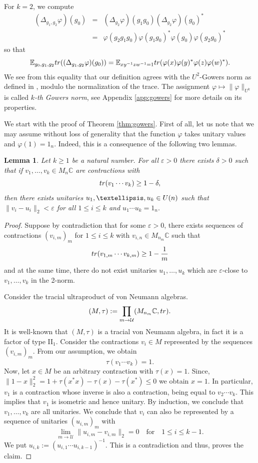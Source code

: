 \documentclass[a4paper,11pt]{amsproc}
\theoremstyle{plain}
\newtheorem{lemma}[theorem]{Lemma}
\theoremstyle{definition}
\begin{document}
For $k=2$, we compute
\begin{eqnarray*}
(\Delta_{g_1,g_2} \varphi)(g_0) &=& 
(\Delta_{g_2} \varphi)(g_1g_0) (\Delta_{g_2} \varphi)(g_0)^{*} \\
&=& \varphi(g_2g_1g_0) \varphi(g_1g_0)^{*} \varphi(g_0) \varphi(g_2g_0)^{*}
\end{eqnarray*}
so that
$${\mathbb E}_{g_0,g_1,g_{2}} {\rm tr}((\Delta_{g_1,g_2} \varphi)(g_0)) =  {\mathbb E}_{xy^{-1}zw^{-1}=1} {\rm tr}(\varphi(x)\varphi(y)^{*}\varphi(z)\varphi(w)^{*}).$$
We see from this equality that our definition agrees with the $U^2$-Gowers norm as defined in \cite{MR3733361}, modulo the normalization of the trace. The assignment $\varphi \mapsto \|\varphi\|_{U^k}$ is called \emph{$k$-th Gowers norm}, see Appendix \ref{app:gowers} for more details on its properties.

We start with the proof of Theorem \ref{thm:gowers}. First of all, let us note that we may assume without loss of generality that the function $\varphi$ takes unitary values and $\varphi(1)=1_n.$ Indeed, this is a consequence of the following two lemmas.

\begin{lemma} \label{lem:unitary}
Let $k \geq 1$ be a natural number. For all $\varepsilon>0$ there exists $\delta>0$ such that if
$v_1,\dots,v_k \in M_n \mathbb C$ are contractions with 
$${\rm tr}(v_1 \cdots v_k) \geq 1-\delta,$$
then there exists unitaries $u_1,\dots,u_k \in {\rm U}(n)$ such that $\|v_i - u_i\|_2 < \varepsilon$ for all $1 \leq i \leq k$ and
$u_1 \cdots u_k=1_n.$
\end{lemma}
\begin{proof}
Suppose by contradiction that for some $\varepsilon>0$, there exists sequences of contractions
$(v_{i,m})_m$ for $1 \leq i \leq k$ with $v_{i,n} \in M_{n_m} \mathbb C$ such that
$${\rm tr}(v_{1,m} \cdots v_{k,m}) \geq 1 - \frac1m$$ and at the same time, there do not exist unitaries $u_1,\dots,u_k$ which are $\varepsilon$-close to $v_1,\dots,v_k$ in the 2-norm. 

Consider the tracial ultraproduct of von Neumann algebras.
$$(M,\tau) := \prod_{m \to \mathcal U} (M_{n_m} \mathbb C,{\rm tr}).$$
It is well-known that $(M,\tau)$ is a tracial von Neumann algebra, in fact it is a factor of type II$_1$. Consider the contractions $v_i \in M$ represented by the sequences $(v_{i,m})_m$. From our assumption, we obtain
$$\tau(v_1 \cdots v_k)=1.$$
Now, let $x \in M$ be an arbitrary contraction with $\tau(x)=1.$
Since,
$\|1-x\|^2_2 = 1 + \tau(x^*x) - \tau(x) - \tau(x^*) \leq 0$
we obtain $x=1.$ In particular, $v_1$ is a contraction whose inverse is also a contraction, being equal to $v_2\cdots v_k$. This implies that $v_1$ is isometric and hence unitary. By induction, we conclude that $v_1,\dots,v_k$ are all unitaries. We conclude that $v_i$ can also be represented by a sequence of unitaries $(u_{i,m})_m$ with $$\lim_{m \to \mathcal U} \|u_{i,m} - v_{i,m}\|_2 = 0 \quad \mbox{for} \quad 1 \leq i \leq k-1.$$ We put $u_{i,k}:=(u_{i,1}\cdots u_{i,k-1})^{-1}$. This is a contradiction and thus, proves the claim.
\end{proof}
\end{document}
